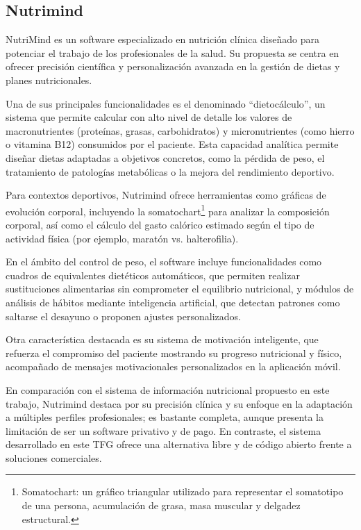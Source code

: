 \subsection{Nutrimind\cite{NutriMind2023}}
NutriMind es un software especializado en nutrición clínica diseñado para potenciar el trabajo de los profesionales de la salud. Su propuesta se centra en ofrecer precisión científica y personalización avanzada en la gestión de dietas y planes nutricionales.

Una de sus principales funcionalidades es el denominado ``dietocálculo'', un sistema que permite calcular con alto nivel de detalle los valores de macronutrientes (proteínas, grasas, carbohidratos) y micronutrientes (como hierro o vitamina B12) consumidos por el paciente. Esta capacidad analítica permite diseñar dietas adaptadas a objetivos concretos, como la pérdida de peso, el tratamiento de patologías metabólicas o la mejora del rendimiento deportivo.

Para contextos deportivos, Nutrimind ofrece herramientas como gráficas de evolución corporal, incluyendo la somatochart\footnote{Somatochart: un gráfico triangular utilizado para representar el somatotipo de una persona, acumulación de grasa, masa muscular y delgadez estructural.} para analizar la composición corporal, así como el cálculo del gasto calórico estimado según el tipo de actividad física (por ejemplo, maratón vs. halterofilia).

En el ámbito del control de peso, el software incluye funcionalidades como cuadros de equivalentes dietéticos automáticos, que permiten realizar sustituciones alimentarias sin comprometer el equilibrio nutricional, y módulos de análisis de hábitos mediante inteligencia artificial, que detectan patrones como saltarse el desayuno o proponen ajustes personalizados.

Otra característica destacada es su sistema de motivación inteligente, que refuerza el compromiso del paciente mostrando su progreso nutricional y físico, acompañado de mensajes motivacionales personalizados en la aplicación móvil.

En comparación con el sistema de información nutricional propuesto en este trabajo, Nutrimind destaca por su precisión clínica y su enfoque en la adaptación a múltiples perfiles profesionales; es bastante completa, aunque presenta la limitación de ser un software privativo y de pago. En contraste, el sistema desarrollado en este TFG ofrece una alternativa libre y de código abierto frente a soluciones comerciales. 

